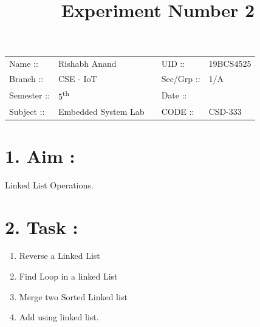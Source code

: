 \documentclass[14pt]{extarticle}
\title{%
    \textbf{
    \vspace{-3em} \\ 
    \Large Experiment Number 2\\
    \vspace{-4em}
    }
}
\author{}
\date{}
\begin{document}
\maketitle %

\section*{}
    \begin{tabular}{ llp{2cm}ll } 
        Name :: & Rishabh Anand & & UID :: & 19BCS4525  \\ 
        Branch :: & CSE - IoT & & Sec/Grp :: & 1/A \\ 
        Semester :: & 5\textsuperscript{th} & & Date :: & \shortdate{\today} \\
        Subject :: & Embedded System Lab & & CODE :: & CSD-333  \\ 
    \end{tabular}
    
\vspace{1em}

\section*{\normalsize 1. Aim :}

Linked List Operations.

\section*{\normalsize 2. Task :}

\begin{enumerate}
  \item Reverse a Linked List
  \item Find Loop in a linked List
  \item Merge two Sorted Linked list
  \item Add using linked list.
\end{enumerate}

\end{document}
